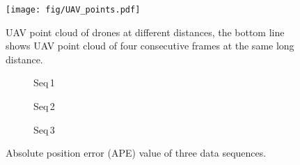 
\begin{figure}[ht]
    \centering
    \texttt{[image: fig/UAV\_points.pdf]}
    \caption{UAV point cloud of drones at different distances, the bottom line shows UAV point cloud of four consecutive frames at the same long distance.}
    \label{fig:pcd_frame}
\end{figure}

\begin{figure*}[ht]
    \begin{subfigure}{.32\textwidth}
        \centering
        \setlength{\figurewidth}{\textwidth}
        \setlength{\figureheight}{1.05\textwidth}
        \scriptsize{}
        \caption{\scriptsize{Seq\,1}}
        \label{fig:err_seq1}
    \end{subfigure}
    \hfill
    \begin{subfigure}{.32\textwidth}
        \centering
        \setlength{\figurewidth}{\textwidth}
        \setlength{\figureheight}{1.03\textwidth}
        \scriptsize{}
        \caption{\scriptsize{Seq\,2}}
        \label{fig:err_seq2}     
    \end{subfigure}
    \hfill
    \begin{subfigure}{.32\textwidth}
        \centering
        \setlength{\figurewidth}{\textwidth}
        \setlength{\figureheight}{\textwidth}
        \scriptsize{}
        \caption{\scriptsize{Seq\,3}}
        \label{fig:err_seq3}     
    \end{subfigure}
    \caption{Absolute position error (APE) value of three data sequences.}
    \label{fig:ape_error} 
\end{figure*}


